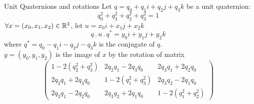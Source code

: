 %
%

%
%
\begin {frame} {Unit Quaternions and rotations}
  Let $q=q_0 + q_1 i + q_2 j + q_3 k$ be a unit quaternion:
  $$q_0^2 + q_3^2 + q_2^2 + q_3^2 = 1$$
  \pause
  $\forall x = (x_0, x_1, x_2)\in\mathbb{R}^3$, let $u=x_0i + x_1 j + x_2 k$
  $$
  q\,.\,u\,.\,q^* = y_0 i + y_1 j + y_2 k
  $$
  where $q^*=q_0 - q_1 i - q_2 j - q_3 k$ is the conjugate of $q$.\\
  \pause
  $y = (y_0, y_1, y_2)$ is the image of $x$ by the rotation of matrix
  $$
  \left(\begin{array}{ccc}1 - 2(q_2^2 + q_3^2) & 2q_2q_1 - 2q_3q_0 & 2q_3q_1 + 2q_2q_0\\ 2q_2q_1 + 2q_3q_0 & 1 - 2(q_1^2 + q_3^2) & 2q_3q_2 - 2q_1q_0\\ 2q_3q_1 - 2q_2q_0 & 2q_3q_2 + 2q_1q_0 & 1 - 2(q_1^2 + q_2^2)\end{array}\right)
  $$
\end{frame}

